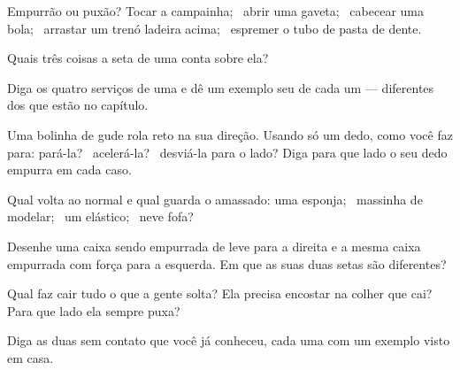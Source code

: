 \begin{exercise}[$\star$]\label{exo:g2:pushes-and-pulls:1}
Empurrão ou puxão? Tocar a campainha; \ abrir uma gaveta; \ cabecear
uma bola; \ arrastar um trenó ladeira acima; \ espremer o tubo de
pasta de dente.
\end{exercise}

\begin{exercise}[$\star$]\label{exo:g2:pushes-and-pulls:2}
Quais três coisas a seta de uma  conta sobre ela?
\end{exercise}

\begin{exercise}[$\star$]\label{exo:g2:pushes-and-pulls:3}
Diga os quatro serviços de uma  e dê um exemplo seu de cada um
--- diferentes dos que estão no capítulo.
\end{exercise}

\begin{exercise}[$\star$]\label{exo:g2:pushes-and-pulls:4}
Uma bolinha de gude rola reto na sua direção. Usando só um dedo, como
você faz para: pará-la? \ acelerá-la? \ desviá-la para o lado? Diga
para que lado o seu dedo empurra em cada caso.
\end{exercise}

\begin{exercise}[$\star$]\label{exo:g2:pushes-and-pulls:5}
Qual volta ao normal e qual guarda o amassado: uma esponja; \
massinha de modelar; \ um elástico; \ neve fofa?
\end{exercise}

\begin{exercise}[$\star$]\label{exo:g2:pushes-and-pulls:6}
Desenhe uma caixa sendo empurrada de leve para a direita e a mesma
caixa empurrada com força para a esquerda. Em que as suas duas setas
são diferentes?
\end{exercise}

\begin{exercise}[$\star$]\label{exo:g2:pushes-and-pulls:7}
Qual  faz cair tudo o que a gente solta? Ela precisa encostar na
colher que cai? Para que lado ela sempre puxa?
\end{exercise}

\begin{exercise}[$\star$]\label{exo:g2:pushes-and-pulls:8}
Diga as duas  sem contato que você já conheceu, cada uma com um
exemplo visto em casa.
\end{exercise}

